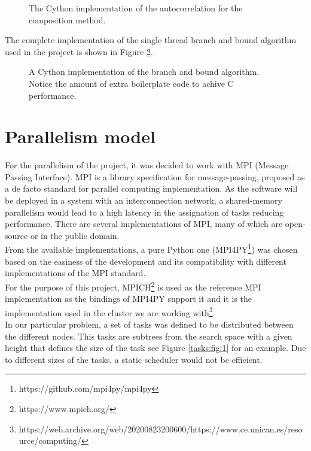       \begin{figure}[ht!]
        \caption{The Cython implementation of the autocorrelation for the composition method.}
        \label{composite_auto:fig:1}
      \end{figure}

  The complete implementation of the single thread branch and bound algorithm used
  in the project is shown in Figure \ref{composite_auto:fig:2}.

  \begin{figure}[ht!]
    \caption{A Cython implementation of the branch and bound algorithm. Notice
    the amount of extra boilerplate code to achive C performance.}
    \label{composite_auto:fig:2}
  \end{figure}


  \section{Parallelism model}

  For the parallelism of the project, it was decided to work with MPI (Message
  Passing Interface).  MPI is a library specification for message-passing, proposed
  as a de facto standard for parallel computing implementation. As the software
  will be deployed in a system with an interconnection network, a shared-memory
  parallelism would lead to a high latency in the assignation of tasks
  reducing performance. There are several implementations of MPI, many of which are
  open-source or in the public domain.\\

 From the available implementations, a pure
 Python one (MPI4PY\footnote{https://github.com/mpi4py/mpi4py}) was chosen based on
 the easiness of the development and its compatibility with different
 implementations of the MPI standard.\\

 For the purpose of this project, MPICH\footnote{https://www.mpich.org/} is used as
 the reference MPI implementation as the bindings of MPI4PY support it and it is the
 implementation used in the cluster we are working with\footnote{https://web.archive.org/web/20200823200600/https://www.ce.unican.es/resource/computing/}.\\

  In our particular problem, a set of tasks was defined to be
  distributed between the different nodes. This tasks are subtrees from the
  search space with a given height that defines the size of the task  see Figure
  \ref{tasks:fig:1} for an example. Due to different sizes of the tasks,  a static
  scheduler would not be efficient.\\


